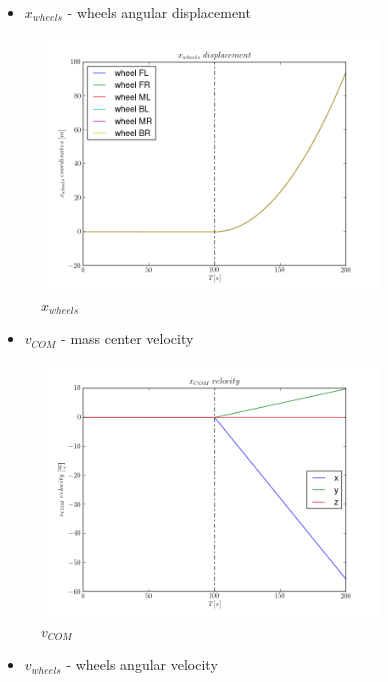 \begin{itemize}
  \item $x_{wheels}$ - wheels angular displacement 
\end{itemize}

\begin{figure}[H]
  \centering
    \includegraphics[width=0.8\textwidth]{xWHEELS4}
  \caption{$x_{wheels}$}
\end{figure}

\begin{itemize}
  \item $v_{COM}$ - mass center velocity
\end{itemize}

\begin{figure}[H]
  \centering
    \includegraphics[width=0.8\textwidth]{vCOM4}
  \caption{$v_{COM}$}
\end{figure}

\begin{itemize}
  \item $v_{wheels}$ - wheels angular velocity
\end{itemize}

